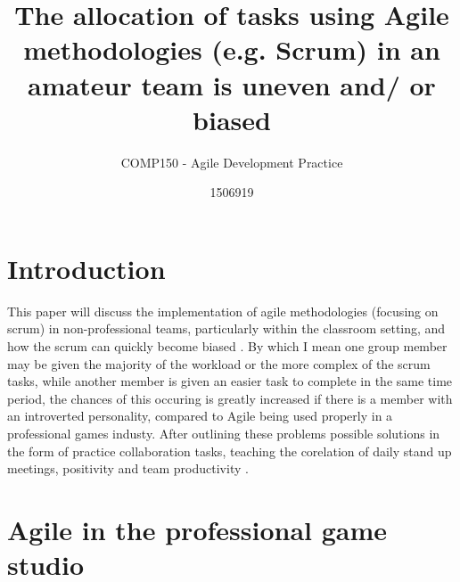 \documentclass{scrartcl}
\title{The allocation of tasks using Agile methodologies (e.g. Scrum) in an amateur team is uneven and/ or biased}
\subtitle{COMP150 - Agile Development Practice}
\author{1506919}
\begin{document}
\maketitle


\section{Introduction}

This paper will discuss the implementation of agile methodologies \cite{beck2001manifesto} (focusing on scrum) in non-professional teams, particularly within the classroom setting, and how the scrum can quickly become biased \cite{kropp2014teaching}. By which I mean one group member may be given the majority of the workload or the more complex of the scrum tasks, while another member is given an easier task to complete in the same time period, the chances of this occuring is greatly increased if there is a member with an introverted personality, compared to Agile being used properly in a professional games industy. After outlining these problems possible solutions in the form of practice collaboration tasks, teaching the corelation of daily stand up meetings, positivity and team productivity \cite{kropp2016teaching}.

\section{Agile in the professional game studio}
\end{document}
